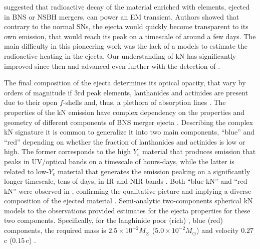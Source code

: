 \citet{Li:1998bw} suggested that 
radioactive decay of the material enriched with \rproc{} elements,
ejected in \ac{BNS} or \ac{NSBH} mergers, can power an \ac{EM} transient.
%
Authors showed that contrary to the normal \acp{SN}, 
the ejecta would quickly become transparent to its own emission, 
that would reach its peak on a timescale of around a few days. 
%
The main difficulty in this pioneering work was the lack of a \nuc{}
models to estimate the radioactive heating in the ejecta. 
%
Our understanding of \ac{kN} has significantly improved since then
\citep[\eg][]{Kulkarni:2005jw,Metzger:2010,Roberts:2011,Metzger:2016pju,Wollaeger:2017ahm} 
and advanced even further with the detection of \AT{} \citep[\eg][]{Metzger:2019zeh}.

The final composition of the ejecta determines its optical opacity, 
that vary by orders of magnitude if $3$rd peak elements, 
lanthanides 
and actinides 
are present 
due to their open $f$-shells and, thus, a plethora of 
absorption lines \citep{Tanaka:2013ana,Kasen:2013xka}.
%
The properties of the \ac{kN} emission have complex 
dependency on the properties and geometry of different components of 
\ac{BNS} merger ejecta \citep{Metzger:2019zeh}.
%
Describing the complex \ac{kN} signature it is common to 
generalize it into two main components, ``blue'' and ``red'' 
depending on whether the fraction of lanthanides and actinides is low or high.
%
The former corresponds to the high $Y_e$ material that produces emission 
that peaks in \ac{UV}/optical bands on a timescale of hours-days, 
while the latter is related to low-$Y_e$ material that generates the 
emission peaking on a significantly 
longer timescale, tens of days, in \ac{IR} and \ac{NIR} bands
\citep{Barnes:2013wka,Grossman:2013lqa,Lippuner:2015gwa}.
%
Both ``blue \ac{kN}'' and ``red \ac{kN}'' were observed in \AT{}, 
confirming the qualitative picture and implying a diverse composition 
of the ejected material \citep[\eg][]{Villar:2017wcc}.
%
Semi-analytic two-components spherical \ac{kN} models to 
the \AT{} observations provided estimates for the ejecta properties 
for these two components. 
%
Specifically, for the langhinide poor (rich) \ie, blue (red) components, 
the required mass is $2.5\times10^{-2}M_{\odot}$ ($5.0\times10^{-2}M_{\odot}$) 
and velocity $0.27\,$c ($0.15\,$c) \citep{Cowperthwaite:2017dyu,Villar:2017wcc}. 


